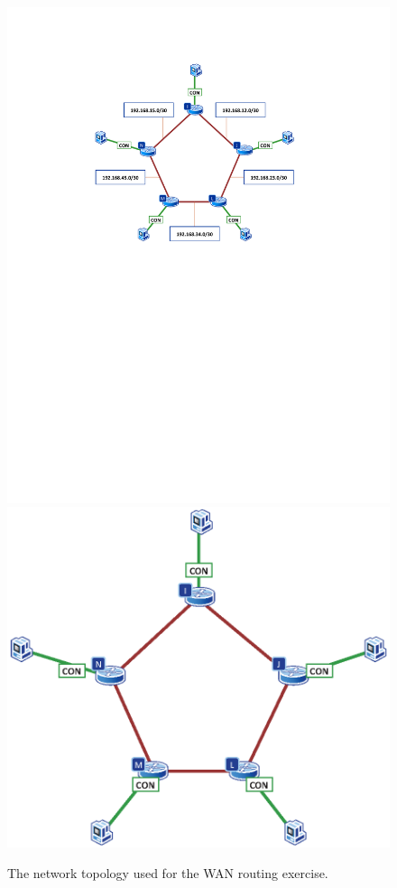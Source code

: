 \begin{figure}
\centering
\ifpdf
\includegraphics[width=0.9\linewidth]{Figures/RoutingSerial.pdf}
\else
\includegraphics[width=0.9\linewidth]{Figures/RoutingSerial.eps}
\fi
\caption{The network topology used for the WAN routing exercise.}
\label{fig:RoutingSerial}
\end{figure}

